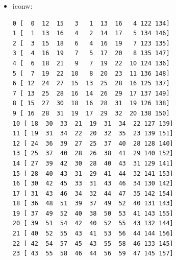 \begin{itemize}
\item iconw:
\begin{verbatim}
0 [  0  12  15   3   1  13  16   4 122 134]
1 [  1  13  16   4   2  14  17   5 134 146]
2 [  3  15  18   6   4  16  19   7 123 135]
3 [  4  16  19   7   5  17  20   8 135 147]
4 [  6  18  21   9   7  19  22  10 124 136]
5 [  7  19  22  10   8  20  23  11 136 148]
6 [ 12  24  27  15  13  25  28  16 125 137]
7 [ 13  25  28  16  14  26  29  17 137 149]
8 [ 15  27  30  18  16  28  31  19 126 138]
9 [ 16  28  31  19  17  29  32  20 138 150]
10 [ 18  30  33  21  19  31  34  22 127 139]
11 [ 19  31  34  22  20  32  35  23 139 151]
12 [ 24  36  39  27  25  37  40  28 128 140]
13 [ 25  37  40  28  26  38  41  29 140 152]
14 [ 27  39  42  30  28  40  43  31 129 141]
15 [ 28  40  43  31  29  41  44  32 141 153]
16 [ 30  42  45  33  31  43  46  34 130 142]
17 [ 31  43  46  34  32  44  47  35 142 154]
18 [ 36  48  51  39  37  49  52  40 131 143]
19 [ 37  49  52  40  38  50  53  41 143 155]
20 [ 39  51  54  42  40  52  55  43 132 144]
21 [ 40  52  55  43  41  53  56  44 144 156]
22 [ 42  54  57  45  43  55  58  46 133 145]
23 [ 43  55  58  46  44  56  59  47 145 157]
\end{verbatim}

\end{itemize}


